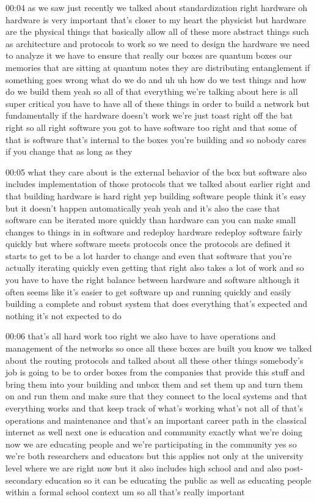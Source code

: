00:04
as we saw just recently we talked about standardization right
hardware oh hardware is very important that's
closer to my heart the physicist but hardware are the
physical things that basically allow all of these more abstract things such as
architecture and protocols to work so we need to design the hardware we need to
analyze it we have to ensure that really our boxes are quantum boxes
our memories that are sitting at quantum notes they are distributing
entanglement if something goes wrong what do we do and uh uh
how do we test things and how do we build them
yeah so all of that everything we're talking about here is all
super critical you have to have all of these things in order to build a network
but fundamentally if the hardware doesn't work we're just toast right off
the bat right so all right software you got to have software too
right and that some of that is software that's internal to the boxes you're
building and so nobody cares if you change that as long as they

00:05
what they care about is the external behavior of the box but software also
includes implementation of those protocols that we talked about earlier
right and that building hardware is hard right yep building software
people think it's easy but it doesn't happen automatically
yeah yeah and it's also the case that software can be iterated more quickly
than hardware can you can make small changes to things in in
software and redeploy hardware redeploy software fairly quickly
but where software meets protocols once the protocols are defined it starts
to get to be a lot harder to change and even that software that you're
actually iterating quickly even getting that right also takes a lot of work
and so you have to have the right balance between hardware and software
although it often seems like it's easier to get
software up and running quickly and easily building a complete and robust
system that does everything that's expected and nothing it's not expected to do

00:06
that's all hard work too right we also have to have operations and
management of the networks so once all these boxes are built you know
we talked about the routing protocols and talked about all these other things
somebody's job is going to be to order boxes from the companies that provide
this stuff and bring them into your building and unbox
them and set them up and turn them on and run them
and make sure that they connect to the local systems and that everything works
and that keep track of what's working what's not all of that's operations and
maintenance and that's an important career path
in the classical internet as well next one is education and community
exactly what we're doing now we are educating people and we're
participating in the community yes so we're both researchers and educators
but this applies not only at the university level where we are right now
but it also includes high school and and also post-secondary
education so it can be educating the public as well as educating people
within a formal school context um so all that's really important

